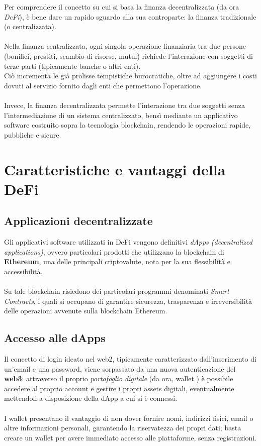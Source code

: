\documentclass{report}
\begin{document}
Per comprendere il concetto su cui si basa la finanza decentralizzata (da ora \textit{DeFi}), è bene dare un rapido sguardo alla sua controparte: la finanza tradizionale (o centralizzata).\\\\
Nella finanza centralizzata, ogni singola operazione finanziaria tra due persone (bonifici, prestiti, scambio di risorse, mutui) richiede l'interazione con soggetti di terze parti (tipicamente banche o altri enti).\\
Ciò incrementa le già prolisse tempistiche burocratiche, oltre ad aggiungere i costi dovuti al servizio fornito dagli enti che permettono l'operazione.
\\\\Invece, la finanza decentralizzata permette l'interazione tra due soggetti senza l'intermediazione di un sistema centralizzato, bensì mediante un applicativo software costruito sopra la tecnologia blockchain, rendendo le operazioni rapide, pubbliche e sicure.


\section{Caratteristiche e vantaggi della DeFi}

\subsection{Applicazioni decentralizzate}
Gli applicativi software utilizzati in DeFi vengono definitivi \textit{dApps (decentralized applications)}, ovvero particolari prodotti che utilizzano la blockchain di \textbf{Ethereum}\cite{ethereum}, una delle principali criptovalute, nota per la sua flessibilità e accessibilità.\\\\
Su tale blockchain risiedono dei particolari programmi denominati \textit{Smart Contracts}\cite{smartcontracts}, i quali si occupano di garantire sicurezza, trasparenza e irreversibilità delle operazioni avvenute sulla blockchain Ethereum.\\

\subsection{Accesso alle dApps}

Il concetto di login ideato nel web2, tipicamente caratterizzato dall'inserimento di un'email e una password, viene sorpassato da una nuova autenticazione del \textbf{web3}\cite{web2_web3}: attraverso il proprio \textit{portafoglio digitale} (da ora, wallet \cite{wallet}) è possibile accedere al proprio account e gestire i propri assets digitali, eventualmente mettendoli a disposizione della dApp a cui si è connessi.
\\\\I wallet presentano il vantaggio di non dover fornire nomi, indirizzi fisici, email o altre informazioni personali, garantendo la riservatezza dei propri dati; basta creare un wallet per avere immediato accesso alle piattaforme, senza registrazioni.
\end{document}
